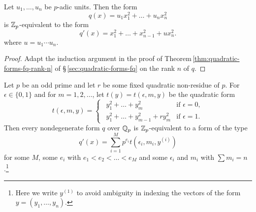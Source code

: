 \begin{lemmax}
    Let \(u_1, \dots, u_n\) be \(p\)-adic units. Then the form
    \[
        q(x) = u_1 x_1^2 + \dots + u_n x_n^2
    \]
    is \(\mathbb{Z}_p\)-equivalent to the form
    \[
        q'(x) = x_1^2 + \dots + x_{n-1}^2 + ux_n^2.
    \]
    where \(u = u_1 \cdots u_{n}\).
\end{lemmax}

\begin{proof}
    Adapt the induction argument in the proof of Theorem\,\ref{thm:quadratic-forms-fq-rank-n} of \S\,\ref{sec:quadratic-forms-fq} on the rank \(n\) of \(q\).
\end{proof}

\begin{theoremx}
    {\normalfont\cite[p.\,115--116]{cassels2008rational}}
    Let \(p\) be an odd prime and let \(r\) be some fixed quadratic non-residue of \(p\). For \(\epsilon \in \{0, 1\}\) and for \(m = 1, 2, \dots\), let \(t(y) = t(\epsilon, m, y)\) be the quadratic form
    \[
        t(\epsilon, m, y) = \begin{cases}
            \ \ y_1^2 + \dots + y_m^2 & \text{if } \epsilon = 0,\\
            \ \ y_1^2 + \dots + y_{m-1}^2 + r y_m^2 & \text{if } \epsilon = 1.
        \end{cases}
    \]
    Then every nondegenerate form \(q\) over \(\mathbb{Q}_p\) is \(\mathbb{Z}_p\)-equivalent to a form of the type
    \begin{equation}\label{eq:canonical-forms}
        q'(x) = \sum_{i=1}^M p^{e_i} t(\epsilon_i, m_i, y^{(i)})
    \end{equation}
    for some \(M\), some \(e_i\) with \(e_1 < e_2 < \dots < e_M\) and some \(\epsilon_i\) and \(m_i\) with \(\sum m_i = n\).\footnote{Here we write \(y^{(1)}\) to avoid ambiguity in indexing the vectors of the form \(y = (y_1, \dots, y_n)\).}
\end{theoremx}

